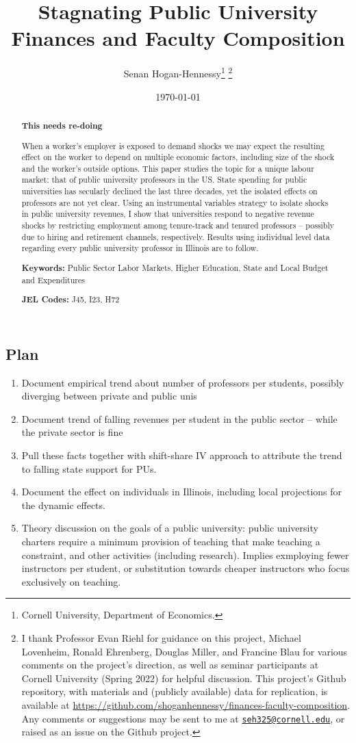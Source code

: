 \documentclass[notitlepage,12pt]{article}
\author{Senan Hogan-Hennessy\thanks{
    Cornell University, Department of Economics.}
    \thanks{I thank Professor Evan Riehl for guidance on this project, Michael Lovenheim, Ronald Ehrenberg, Douglas Miller, and Francine Blau for various comments on the project's direction,
    as well as seminar participants at Cornell University (Spring 2022) for helpful
    discussion.
    This project's Github repository, with materials and (publicly available) data for replication, is available at 
    \url{https://github.com/shoganhennessy/finances-faculty-composition}.
    Any comments or suggestions may be sent to me at \href{mailto:seh325@cornell.edu}{\nolinkurl{seh325@cornell.edu}}, or raised as an issue on the Github project.}}
\title{Stagnating Public University Finances and Faculty Composition}
\date{\today}
\begin{document}
\clearpage \maketitle
\thispagestyle{empty}
\begin{abstract}
\noindent
\textbf{This needs re-doing}

When a worker's employer is exposed to demand shocks we may expect the resulting effect on the worker to depend on multiple economic factors, including size of the shock and the worker's outside options.
This paper studies the topic for a unique labour market: that of public university professors in the US.
State spending for public universities has secularly declined the last three decades, yet the isolated effects on professors are not yet clear.
Using an instrumental variables strategy to isolate shocks in public university revenues, I show that universities respond to negative revenue shocks by restricting employment among tenure-track and tenured professors -- possibly due to hiring and retirement channels, respectively.
Results using individual level data regarding every public university professor in Illinois are to follow.

\vspace{0.75cm}
\noindent\textbf{Keywords:} Public Sector Labor Markets, Higher Education, State and Local Budget and Expenditures

\vspace{0.5cm}
\noindent\textbf{JEL Codes:} J45, I23, H72
\end{abstract}
\newpage
\setcounter{page}{1}
\newpage
\doublespacing


\subsection{Plan}
\begin{enumerate}
    \item Document empirical trend about number of professors per students, possibly diverging between private and public unis
    \item Document trend of falling revenues per student in the public sector -- while the private sector is fine
    \item Pull these facts together with shift-share IV approach to attribute the trend to falling state support for PUs.
    \item Document the effect on individuals in Illinois, including local projections for the dynamic effects.
    \item Theory discussion on the goals of a public university: public university charters require a minimum provision of teaching that make teaching a constraint, and other activities (including research).
    Implies exmploying fewer instructors per student, or substitution towards cheaper instructors who focus exclusively on teaching. 
\end{enumerate}
\end{document}
